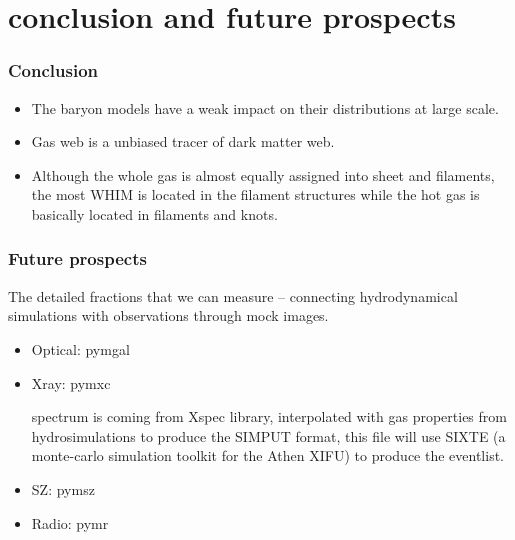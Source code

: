 \documentclass[aspectratio=43]{beamer}
\begin{document}
\section{conclusion and future prospects}
\begin{frame}
  \frametitle{Conclusion}
  {\Large
  \begin{itemize}
    \item The baryon models have a weak impact on their distributions at large scale.
    \item Gas web is a unbiased tracer of dark matter web.
    \item Although the whole gas is almost equally assigned into sheet and filaments, the most WHIM is located in the filament structures while the hot gas is basically located in filaments and knots.
  \end{itemize}}
\end{frame}

\begin{frame}
  \frametitle{Future prospects}
  The detailed fractions that we can measure -- connecting hydrodynamical simulations with observations through mock images.
  \begin{itemize}
    \item Optical: pymgal
    \item Xray: pymxc 
    
        spectrum is coming from Xspec library, interpolated with gas properties from hydrosimulations to produce the SIMPUT format, this file will use SIXTE (a monte-carlo simulation toolkit for the Athen XIFU) to produce the eventlist.
    \item SZ: pymsz
    \item Radio: pymr
  \end{itemize}

\end{frame}
\end{document}
